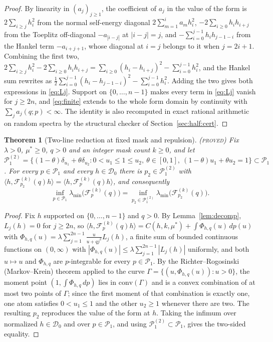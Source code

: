 \documentclass[11pt]{article}
\newcommand{\Fcal}{\mathcal F}
\newcommand{\muS}{\mu^{*}}
\newtheorem{theorem}{Theorem}[section]
\theoremstyle{definition}
\theoremstyle{remark}
\newcommand{\proved}{\textnormal{\textsc{(proved)}}}
\begin{document}
\begin{proof}
By linearity in $(a_j)_{j\ge1}$, the coefficient of $a_j$ in the value of the form is
$2\sum_{i\ge j}h_i^2$ from the normal self-energy diagonal $2\sum_{m=1}^{i}a_mh_i^2$,
$-2\sum_{i\ge0}h_ih_{i+j}$ from the Toeplitz off-diagonal $-a_{|i-j|}$ at
$|i-j|=j$, and $-\sum_{i=0}^{j-1}h_ih_{j-1-i}$ from the Hankel term $-a_{i+j+1}$, whose
diagonal at $i=j$ belongs to it when $j=2i+1$. Combining the first two,
$2\sum_{i\ge j}h_i^2-2\sum_{i\ge0}h_ih_{i+j}
=\sum_{i\ge0}(h_i-h_{i+j})^2-\sum_{i=0}^{j-1}h_i^2$, and the Hankel sum rewrites as
$\tfrac12\sum_{i=0}^{j-1}(h_i-h_{j-1-i})^2-\sum_{i=0}^{j-1}h_i^2$. Adding the two gives
both expressions in \eqref{eq:Lj}. Support on $\{0,\dots,n-1\}$ makes every term in
\eqref{eq:Lj} vanish for $j\ge2n$, and \eqref{eq:finite} extends to the whole form domain
by continuity with $\sum_j a_j(q;p)<\infty$. The identity is also recomputed in exact
rational arithmetic on random spectra by the structural checker of
Section~\ref{sec:half:cert}.
\end{proof}

\begin{theorem}[Two-line reduction at fixed mask and repulsion]\label{thm:twodelta}\proved
Fix $\lambda>0$, $\muS\ge0$, $q>0$ and an integer mask count $k\ge0$, and let
$\mathcal P_1^{(2)}=\{(1-\theta)\delta_{u_1}+\theta\delta_{u_2}:0<u_1\le1\le u_2,\
\theta\in[0,1],\ (1-\theta)u_1+\theta u_2=1\}\subset\mathcal P_1$. For every
$p\in\mathcal P_1$ and every $h\in\mathcal D_0$ there is $p_2\in\mathcal P_1^{(2)}$ with
$\langle h,\Fcal_{p_2}^{(k)}(q)h\rangle=\langle h,\Fcal_p^{(k)}(q)h\rangle$, and
consequently
\[
\inf_{p\in\mathcal P_1}\lambda_{\min}\big(\Fcal_p^{(k)}(q)\big)
=\inf_{p_2\in\mathcal P_1^{(2)}}\lambda_{\min}\big(\Fcal_{p_2}^{(k)}(q)\big).
\]
\end{theorem}

\begin{proof}
Fix $h$ supported on $\{0,\dots,n-1\}$ and $q>0$. By Lemma~\ref{lem:decomp},
$L_j(h)=0$ for $j\ge2n$, so
$\langle h,\Fcal_p^{(k)}(q)h\rangle=C(h,k,\muS)+\int\Phi_{h,q}(u)\,dp(u)$ with
$\Phi_{h,q}(u)=\lambda\sum_{j=1}^{2n-1}\frac{u}{u+qj^2}L_j(h)$, a finite sum of bounded
continuous functions on $(0,\infty)$ with
$|\Phi_{h,q}(u)|\le\lambda\sum_{j=1}^{2n-1}|L_j(h)|$ uniformly, and both $u\mapsto u$ and
$\Phi_{h,q}$ are $p$-integrable for every $p\in\mathcal P_1$. By the
Richter--Rogosinski (Markov--Krein) theorem applied to the curve
$\Gamma=\{(u,\Phi_{h,q}(u)):u>0\}$, the moment point
$(1,\int\Phi_{h,q}\,dp)$ lies in $\mathrm{conv}(\Gamma)$ and is a convex combination of at
most two points of $\Gamma$; since the first moment of that combination is exactly one,
one atom satisfies $0<u_1\le1$ and the other $u_2\ge1$ whenever there are two. The
resulting $p_2$ reproduces the value of the form at $h$. Taking the infimum over
normalized $h\in\mathcal D_0$ and over $p\in\mathcal P_1$, and using
$\mathcal P_1^{(2)}\subset\mathcal P_1$, gives the two-sided equality.
\end{proof}
\end{document}
